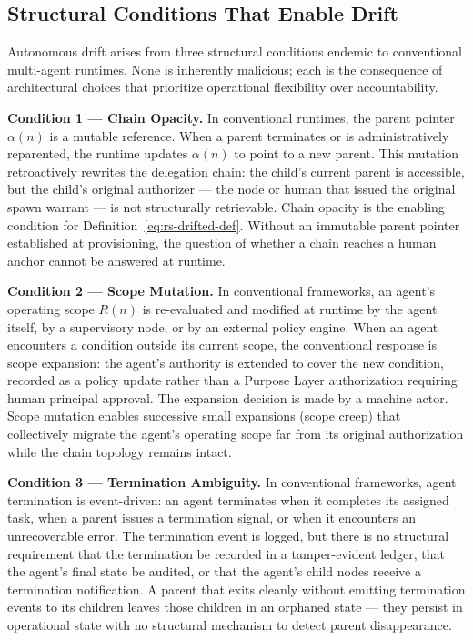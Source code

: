 \subsection{Structural Conditions That Enable Drift}
\label{sec:rs-drift-conditions}

Autonomous drift arises from three structural conditions endemic to conventional multi-agent runtimes. None is inherently malicious; each is the consequence of architectural choices that prioritize operational flexibility over accountability.

\medskip
\noindent\textbf{Condition 1 — Chain Opacity.}
In conventional runtimes, the parent pointer $\alpha(n)$ is a mutable reference. When a parent terminates or is administratively reparented, the runtime updates $\alpha(n)$ to point to a new parent. This mutation retroactively rewrites the delegation chain: the child's current parent is accessible, but the child's original authorizer — the node or human that issued the original spawn warrant — is not structurally retrievable. Chain opacity is the enabling condition for Definition~\ref{eq:rs-drifted-def}. Without an immutable parent pointer established at provisioning, the question of whether a chain reaches a human anchor cannot be answered at runtime.

\medskip
\noindent\textbf{Condition 2 — Scope Mutation.}
In conventional frameworks, an agent's operating scope $R(n)$ is re-evaluated and modified at runtime by the agent itself, by a supervisory node, or by an external policy engine. When an agent encounters a condition outside its current scope, the conventional response is scope expansion: the agent's authority is extended to cover the new condition, recorded as a policy update rather than a Purpose Layer authorization requiring human principal approval. The expansion decision is made by a machine actor. Scope mutation enables successive small expansions (scope creep) that collectively migrate the agent's operating scope far from its original authorization while the chain topology remains intact.

\medskip
\noindent\textbf{Condition 3 — Termination Ambiguity.}
In conventional frameworks, agent termination is event-driven: an agent terminates when it completes its assigned task, when a parent issues a termination signal, or when it encounters an unrecoverable error. The termination event is logged, but there is no structural requirement that the termination be recorded in a tamper-evident ledger, that the agent's final state be audited, or that the agent's child nodes receive a termination notification. A parent that exits cleanly without emitting termination events to its children leaves those children in an orphaned state — they persist in operational state with no structural mechanism to detect parent disappearance.

